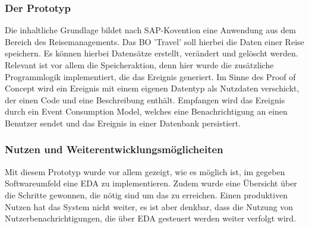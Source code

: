 \subsubsection*{Der Prototyp}
Die inhaltliche Grundlage bildet nach SAP-Kovention eine Anwendung aus dem Bereich des Reisemanagements. Das \ac{BO} 'Travel' soll hierbei die Daten einer Reise speichern. Es können hierbei Datensätze erstellt, verändert und gelöscht werden. Relevant ist vor allem die Speicheraktion, denn hier wurde die zusätzliche Programmlogik implementiert, die das Ereignis generiert. Im Sinne des Proof of Concept wird ein Ereignis mit einem eigenen Datentyp als Nutzdaten verschickt, der einen Code und eine Beschreibung enthält. 
Empfangen wird das Ereignis durch ein Event Consumption Model, welches eine Benachrichtigung an einen Benutzer sendet und das Ereignis in einer Datenbank persistiert.\\
\subsubsection*{Nutzen und Weiterentwicklungsmöglicheiten}
Mit diesem Prototyp wurde vor allem gezeigt, wie es möglich ist, im gegeben Softwareumfeld eine \ac{EDA} zu implementieren. Zudem wurde eine Übersicht über die Schritte gewonnen, die nötig sind um das zu erreichen. 
Einen produktiven Nutzen hat das System nicht weiter, es ist aber denkbar, dass die Nutzung von Nutzerbenachrichtigungen, die über \ac{EDA} gesteuert werden weiter verfolgt wird.\\
